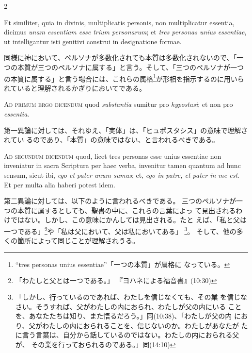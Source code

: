 \documentclass[paper=a4paper,fontsize=10pt,jafontsize=9pt,titlepage]{jlreq}
\begin{document}
\begin{paracol}{2}
\switchcolumn*

Et similiter, quia in divinis, multiplicatis personis, non
multiplicatur essentia, dicimus {\itshape unam essentiam esse trium personarum}; et
{\itshape tres personas unius essentiae}, ut intelligantur isti genitivi construi
in designatione formae.

\switchcolumn

同様に神において、ペルソナが多数化されても本質は多数化されないので、「一
 つの本質が三つのペルソナに属する」と言う。そして、「三つのペルソナが一つ
 の本質に属する」と言う場合には、これらの属格\footnote{``tres personas
 unius essentiae''「一つの本質」が属格に
 なっている。}が形相を指示するのに用いられていると理解されるかぎりにおいてである。

\switchcolumn*

{\scshape Ad primum ergo dicendum} quod {\itshape substantia} sumitur pro {\itshape hypostasi}; et non
pro {\itshape essentia}.

\switchcolumn

第一異論に対しては、それゆえ、「実体」は、「ヒュポスタシス」の意味で理解されてい
 るのであり、「本質」の意味ではない、と言われるべきである。

\switchcolumn*

{\scshape Ad secundum dicendum} quod, licet tres personas esse unius essentiae non
inveniatur in sacra Scriptura per haec verba, invenitur tamen quantum ad
hunc sensum, sicut ibi, {\itshape ego et pater unum sumus}; et, {\itshape ego in patre, et
pater in me est}. Et per multa alia haberi potest idem.

\switchcolumn

第二異論に対しては、以下のように言われるべきである。
三つのペルソナが一つの本質に属するとしても、聖書の中に、これらの言葉によっ
 て見出されるわけではない。しかし、この意味にかんしては見出される。たと
 えば、「私と父は一つである」\footnote{「わたしと父とは一つである。」
 『ヨハネによる福音書』(10:30)}や「私は父において、父は私においてある」
 \footnote{「しかし、行っているのであれば、わたしを信じなくても、その業
 を信じなさい。そうすれば、父がわたしの内におられ、わたしが父の内にいる
 ことを、あなたたちは知り、また悟るだろう。」同(10:38)、「わたしが父の内
 におり、父がわたしの内におられることを、信じないのか。わたしがあなたが
 たに言う言葉は、自分から話しているのではない。わたしの内におられる父が、
 その業を行っておられるのである。」同(14:10)}。
 そして、他の多くの箇所によって同じことが理解されうる。

\switchcolumn*


\end{paracol}
\end{document}
